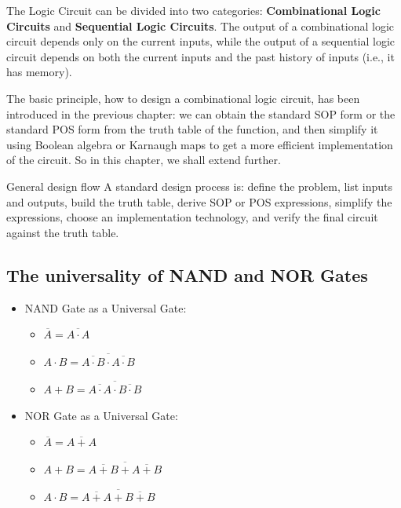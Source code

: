 \documentclass[11pt,a4paper]{article}
\providecommand{\tightlist}{\setlength{\itemsep}{1pt}\setlength{\parskip}{0pt}}
\begin{document}
The Logic Circuit can be divided into two categories:
\textbf{Combinational Logic Circuits} and \textbf{Sequential Logic
Circuits}. The output of a combinational logic circuit depends only on
the current inputs, while the output of a sequential logic circuit
depends on both the current inputs and the past history of inputs (i.e.,
it has memory).

The basic principle, how to design a combinational logic circuit, has
been introduced in the previous chapter: we can obtain the standard SOP
form or the standard POS form from the truth table of the function, and
then simplify it using Boolean algebra or Karnaugh maps to get a more
efficient implementation of the circuit. So in this chapter, we shall
extend further.

\begin{notebox}{General design flow}
A standard design process is: define the problem, list inputs and outputs, build the truth table, derive SOP or POS expressions, simplify the expressions, choose an implementation technology, and verify the final circuit against the truth table.
\end{notebox}

\subsection{The universality of NAND and NOR
Gates}\label{the-universality-of-nand-and-nor-gates}

\begin{itemize}
\tightlist
\item
  NAND Gate as a Universal Gate:

  \begin{itemize}
  \tightlist
  \item
    \(\overline{A} = \overline{A \cdot A}\)
  \item
    \(A \cdot B = \overline{\overline{A \cdot B} \cdot \overline{A \cdot B}}\)
  \item
    \(A + B = \overline{\overline{A \cdot A} \cdot \overline{B \cdot B}}\)
  \end{itemize}
\item
  NOR Gate as a Universal Gate:

  \begin{itemize}
  \tightlist
  \item
    \(\overline{A} = \overline{A + A}\)
  \item
    \(A + B = \overline{\overline{A + B} + \overline{A + B}}\)
  \item
    \(A \cdot B = \overline{\overline{A + A} + \overline{B + B}}\)
  \end{itemize}
\end{itemize}
\end{document}
